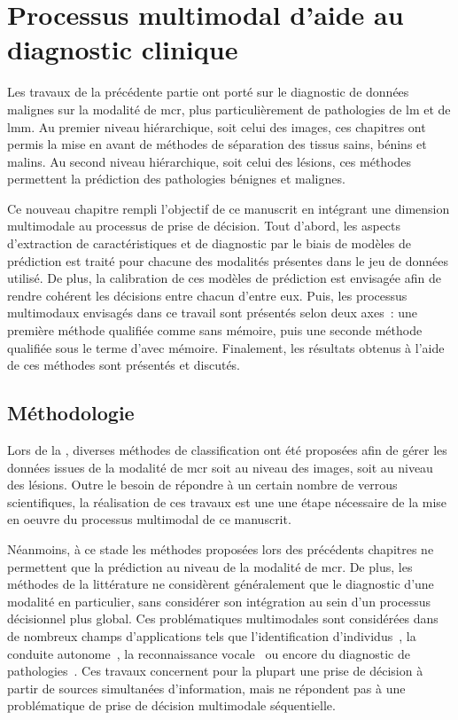 \renewcommand{\thechapter}{\arabic{chapter}}
\setcounter{chapter}{7}

\chapter{Processus multimodal d'aide au diagnostic clinique}
\label{chap:chapter_8}
\chapterintro
Les travaux de la précédente partie ont porté sur le diagnostic de données malignes sur la modalité de \acrlong{mcr}, plus particulièrement de pathologies de \acrlong{lm} et de \acrlong{lmm}. Au premier niveau hiérarchique, soit celui des images, ces chapitres ont permis la mise en avant de méthodes de séparation des tissus sains, bénins et malins. Au second niveau hiérarchique, soit celui des lésions, ces méthodes permettent la prédiction des pathologies bénignes et malignes.\par

Ce nouveau chapitre rempli l'objectif de ce manuscrit en intégrant une dimension multimodale au processus de prise de décision. Tout d'abord, les aspects d'extraction de caractéristiques et de diagnostic par le biais de modèles de prédiction est traité pour chacune des modalités présentes dans le jeu de données utilisé. De plus, la calibration de ces modèles de prédiction est envisagée afin de rendre cohérent les décisions entre chacun d’entre eux. Puis, les processus multimodaux envisagés dans ce travail sont présentés selon deux axes~: une première méthode qualifiée comme sans mémoire, puis une seconde méthode qualifiée sous le terme d’avec mémoire. Finalement, les résultats obtenus à l'aide de ces méthodes sont présentés et discutés.\par
\newpage

\section{Méthodologie}
Lors de la , diverses méthodes de classification ont été proposées afin de gérer les données issues de la modalité de \gls{mcr} soit au niveau des images, soit au niveau des lésions. Outre le besoin de répondre à un certain nombre de verrous scientifiques, la réalisation de ces travaux est une une étape nécessaire de la mise en oeuvre du processus multimodal de ce manuscrit.\par

Néanmoins, à ce stade les méthodes proposées lors des précédents chapitres ne permettent que la prédiction au niveau de la modalité de \gls{mcr}. De plus, les méthodes de la littérature ne considèrent généralement que le diagnostic d'une modalité en particulier, sans considérer son intégration au sein d'un processus décisionnel plus global. Ces problématiques multimodales sont considérées dans de nombreux champs d'applications tels que l'identification d'individus~\cite{Lupu2008}, la conduite autonome~\cite{Xiao2019}, la reconnaissance vocale~\cite{Ngiam2011} ou encore du diagnostic de pathologies~\cite{Lim2014, Liu2015a}. Ces travaux concernent pour la plupart une prise de décision à partir de sources simultanées d'information, mais ne répondent pas à une problématique de prise de décision multimodale séquentielle.\par

